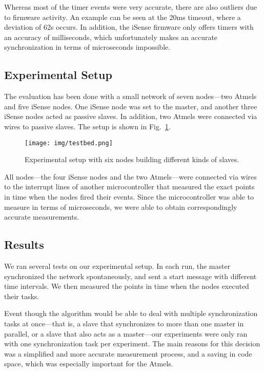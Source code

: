 Whereas most of the timer events were very accurate, there are also
outliers due to firmware activity. An example can be seen at the 20ms
timeout, where a deviation of 62s occurs. In addition, the iSense
firmware only offers timers with an accuracy of milliseconds, which
unfortunately makes an accurate synchronization in terms of
microseconds impossible.

\subsection{Experimental Setup}

The evaluation has been done with a small network of seven nodes---two
Atmels and five iSense nodes. One iSense node was set to the master,
and another three iSense nodes acted as passive slaves. In addition,
two Atmels were connected via wires to passive slaves. The setup is
shown in Fig.~\ref{sec:exp:exp_setup}.

\begin{figure}
  \centering
  \texttt{[image: img/testbed.png]}
  \caption{Experimental setup with six nodes building different kinds
    of slaves.}
  \label{sec:exp:exp_setup}
\end{figure}

All nodes---the four iSense nodes and the two Atmels---were connected
via wires to the interrupt lines of another microcontroller that
measured the exact points in time when the nodes fired their
events. Since the microcontroller was able to measure in terms of
microseconds, we were able to obtain correspondingly accurate
measurements.

\subsection{Results}

We ran several tests on our experimental setup. In each run, the
master synchronized the network spontaneously, and sent a start
message with different time intervals. We then measured the points in
time when the nodes executed their tasks.

Event though the algorithm would be able to deal with multiple
synchronization tasks at once---that is, a slave that synchronizes to
more than one master in parallel, or a slave that also acts as a
master---our experiments were only ran with one synchronization task
per experiment. The main reasons for this decision was a simplified
and more accurate measurement process, and a saving in code space,
which was especially important for the Atmels.

